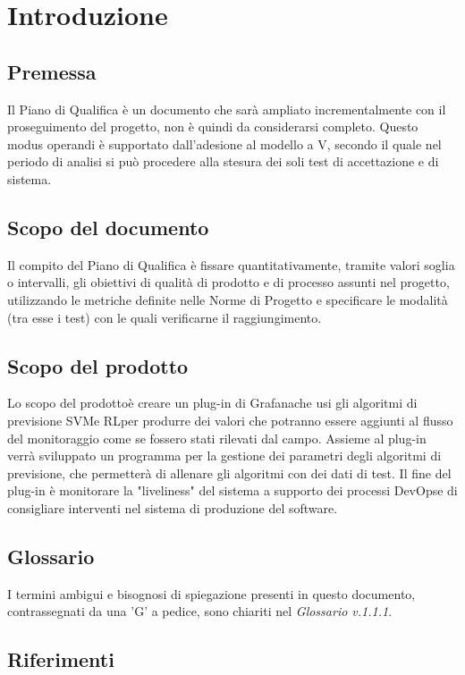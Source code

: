 \section{Introduzione}
	\subsection{Premessa}
	Il Piano di Qualifica è un documento che sarà ampliato incrementalmente con il proseguimento del progetto\glo, non è quindi da considerarsi completo. Questo modus operandi è supportato dall'adesione al modello a V\glo, secondo il quale nel periodo di analisi si può procedere alla stesura dei soli test di accettazione e di sistema.
	
	\subsection{Scopo del documento}
	Il compito del Piano di Qualifica è fissare quantitativamente, tramite valori soglia o intervalli, gli obiettivi di qualità di prodotto e di processo assunti nel progetto\glo, utilizzando le metriche definite nelle Norme di Progetto e specificare le modalità (tra esse i test) con le quali verificarne il raggiungimento.

	\subsection{Scopo del prodotto\glo}
	Lo scopo del prodotto\glosp è creare un plug-in di Grafana\glosp che usi gli algoritmi di previsione SVM\glosp e RL\glosp per produrre dei valori che potranno essere aggiunti al flusso del monitoraggio come se fossero stati rilevati dal campo. Assieme al plug-in verrà sviluppato un programma per la gestione dei parametri degli algoritmi di previsione, che permetterà di allenare gli algoritmi con dei dati di test. Il fine del plug-in è monitorare la "liveliness" del sistema a supporto dei processi DevOps\glosp e di consigliare interventi nel sistema di produzione del software.
	
	\subsection{Glossario}
	I termini ambigui e bisognosi di spiegazione presenti in questo documento, contrassegnati da una 'G' a pedice, sono chiariti nel \textit{Glossario v.1.1.1}.
	
	\subsection{Riferimenti}
